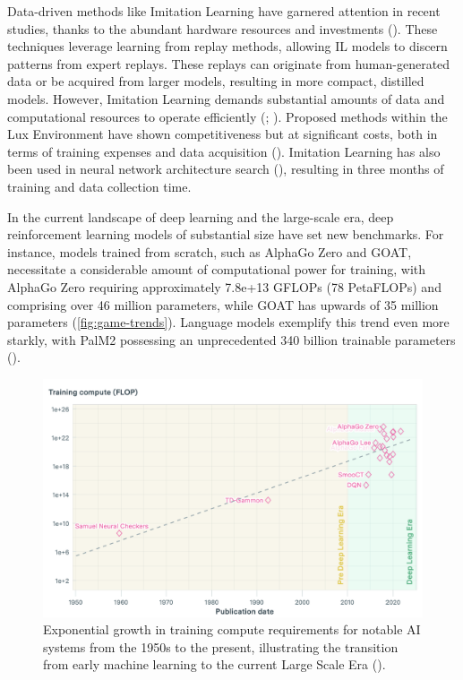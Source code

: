 \bigskip

\noindent Data-driven methods like Imitation Learning have garnered attention in recent studies, thanks to the abundant hardware resources and investments (\textcolor{deepblue}{\cite{imit_learning}}). These techniques leverage learning from replay methods, allowing IL models to discern patterns from expert replays. These replays can originate from human-generated data or be acquired from larger models, resulting in more compact, distilled models. However, Imitation Learning demands substantial amounts of data and computational resources to operate efficiently (\textcolor{deepblue}{\cite{goecks2022combining}; \cite{garg2022iqlearn}}). Proposed methods within the Lux Environment have shown competitiveness but at significant costs, both in terms of training expenses and data acquisition (\textcolor{deepblue}{\cite{nagradov}}). Imitation Learning has also been used in neural network architecture search (\textcolor{deepblue}{\cite{ferdinand}}), resulting in three months of training and data collection time.

\bigskip

\noindent In the current landscape of deep learning and the large-scale era, deep reinforcement learning models of substantial size have set new benchmarks. For instance, models trained from scratch, such as AlphaGo Zero and GOAT, necessitate a considerable amount of computational power for training, with AlphaGo Zero requiring approximately 7.8e+13 GFLOPs (78 PetaFLOPs) and comprising over 46 million parameters, while GOAT has upwards of 35 million parameters (\textcolor{deepblue}{\autoref{fig:game-trends}}). Language models exemplify this trend even more starkly, with PalM2 possessing an unprecedented 340 billion trainable parameters (\textcolor{deepblue}{\cite{Sevilla_2022}}). 

\bigskip

\begin{figure}[htbp]
    \centering
    \includegraphics[width=0.9\linewidth]{images/intro/related_works/game-trends.png}
    \captionsetup{justification=justified, singlelinecheck=false, width=1\linewidth, labelfont=bf}     
    \caption{Exponential growth in training compute requirements for notable AI systems from the 1950s to the present, illustrating the transition from early machine learning to the current Large Scale Era (\textcolor{deepblue}{\cite{epoch2023pcdtrends}}).}
    \label{fig:game-trends}
\end{figure}

